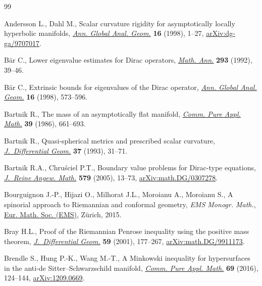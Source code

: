 \documentclass[pdftex]{sigma}
\numberwithin{equation}{section}
\begin{document}
\begin{thebibliography}{99}
\footnotesize\itemsep=0pt

Andersson L., Dahl M., Scalar curvature rigidity for asymptotically locally
 hyperbolic manifolds, \href{https://doi.org/10.1023/A:1006547905892}{\textit{Ann. Global Anal. Geom.}} \textbf{16} (1998),
 1--27, \href{https://arxiv.org/abs/dg-ga/9707017}{arXiv:dg-ga/9707017}.

B\"ar C., Lower eigenvalue estimates for {D}irac operators, \href{https://doi.org/10.1007/BF01444701}{\textit{Math. Ann.}}
 \textbf{293} (1992), 39--46.

B\"ar C., Extrinsic bounds for eigenvalues of the {D}irac operator,
 \href{https://doi.org/10.1023/A:1006550532236}{\textit{Ann. Global Anal. Geom.}} \textbf{16} (1998), 573--596.

Bartnik R., The mass of an asymptotically flat manifold, \href{https://doi.org/10.1002/cpa.3160390505}{\textit{Comm. Pure
 Appl. Math.}} \textbf{39} (1986), 661--693.

Bartnik R., Quasi-spherical metrics and prescribed scalar curvature,
 \href{https://doi.org/10.4310/jdg/1214453422}{\textit{J.~Differential Geom.}} \textbf{37} (1993), 31--71.

Bartnik R.A., Chru\'sciel P.T., Boundary value problems for {D}irac-type
 equations, \href{https://doi.org/10.1515/crll.2005.2005.579.13}{\textit{J.~Reine Angew. Math.}} \textbf{579} (2005), 13--73,
 \href{https://arxiv.org/abs/math.DG/0307278}{arXiv:math.DG/0307278}.

Bourguignon J.-P., Hijazi O., Milhorat J.L., Moroianu A., Moroianu S., A
 spinorial approach to {R}iemannian and conformal geometry, \textit{EMS Monogr. Math.},
 \href{https://doi.org/10.4171/136}{Eur. Math. Soc. (EMS)}, Z\"urich, 2015.

Bray H.L., Proof of the {R}iemannian {P}enrose inequality using the positive
 mass theorem, \href{https://doi.org/10.4310/jdg/1090349428}{\textit{J.~Differential Geom.}} \textbf{59} (2001), 177--267,
 \href{https://arxiv.org/abs/math.DG/9911173}{arXiv:math.DG/9911173}.

Brendle S., Hung P.-K., Wang M.-T., A {M}inkowski inequality for hypersurfaces in
 the anti-de {S}itter--{S}chwarzschild manifold, \href{https://doi.org/10.1002/cpa.21556}{\textit{Comm. Pure Appl.
 Math.}} \textbf{69} (2016), 124--144, \href{https://arxiv.org/abs/1209.0669}{arXiv:1209.0669}.


\end{thebibliography}
\end{document}
